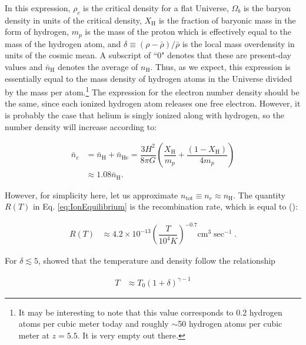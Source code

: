 In this expression, $\rho_c$ is the critical density for a flat Universe, $\Omega_{b}$ is the baryon density in units of the critical density, $X_{\text{H}}$ is the fraction of baryonic mass in the form of hydrogen, $m_{p}$ is the mass of the proton which is effectively equal to the mass of the hydrogen atom, and $\delta \equiv (\rho-\bar{\rho})/\bar{\rho}$ is the local mass overdensity in units of the cosmic mean. A subscript of ``0" denotes that these are present-day values and $\bar{n}_{\text{H}}$ denotes the average of $n_{\text{H}}$. Thus, as we expect, this expression is essentially equal to the mass density of hydrogen atoms in the Universe divided by the mass per atom.\footnote{It may be interesting to note that this value corresponds to 0.2 hydrogen atoms per cubic meter today and roughly $\sim$50 hydrogen atoms per cubic meter at $z = 5.5$. It is very empty out there.}  The expression for the electron number density should be the same, since each ionized hydrogen atom releases one free electron. However, it is probably the case that helium is singly ionized along with hydrogen, so the number density will increase according to:

\begin{align}
\bar{n}_e &= \bar{n}_{\text{H}} + \bar{n}_{\text{He}} = \dfrac{3H^2}{8\pi G}\left( \dfrac{X_{\text{H}}}{m_{p}} + \dfrac{(1 - X_{\text{H}})}{4m_{p}} \right) \\
&\approx 1.08 \bar{n}_{\text{H}}. 
\end{align}

However, for simplicity here, let us approximate $n_{\text{tot}} \equiv n_{e} \approx n_{\text{H}}$. The quantity $R(T)$ in Eq. \ref{eq:IonEquilibrium} is the recombination rate, which is equal to (\citealt{Hui1997}):

\begin{align}
R(T) &\approx 4.2 \times 10^{-13}\left( \dfrac{T}{10^{4} K}\right)^{-0.7} \text{cm}^{3}\sec^{-1}. \label{eq:RecombinationRate}
\end{align}

For $\delta \lesssim 5$, \cite{Hui1997} showed that the temperature and density follow the relationship

\begin{align}
T &\approx T_{0}(1+\delta)^{\gamma - 1} \label{eq:Trelation}
\end{align}

